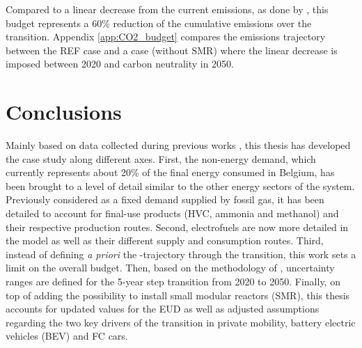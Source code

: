 Compared to a linear decrease from the current emissions, as done by \citet{limpens2024pathway}, this budget represents a 60\% reduction of the cumulative emissions over the transition.  Appendix \ref{app:CO2_budget} compares the emissions trajectory between the REF case and a case (without \gls{SMR}) where the linear decrease is imposed between 2020 and carbon neutrality in 2050.

\section{Conclusions}
\label{sec:cs:conclusions}
Mainly based on data collected during previous works \cite{Moret2017PhDThesis,limpens2021generating}, this thesis has developed the case study along different axes. First, the non-energy demand, which currently represents about 20\% of the final energy consumed in Belgium, has been brought to a level of detail similar to the other energy sectors of the system. Previously considered as a fixed demand supplied by fossil gas, it has been detailed to account for final-use products (\ie \acrfull{HVC}, ammonia and methanol) and their respective production routes. Second, electrofuels are now more detailed in the model as well as their different supply and consumption routes. Third, instead of defining \textit{a priori} the -trajectory through the transition, this work sets a limit on the overall  budget. Then, based on the methodology of \citet{Moret2017}, uncertainty ranges are defined for the 5-year step transition from 2020 to 2050. Finally, on top of adding the possibility to install small modular reactors (SMR), this thesis accounts for updated values for the \gls{EUD} as well as adjusted assumptions regarding the two key drivers of the transition in private mobility, \ie battery electric vehicles (BEV) and \acrfull{FC} cars.